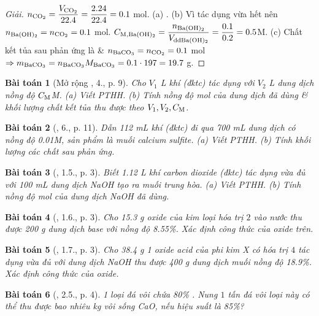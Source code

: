 \documentclass{article}
\newtheorem{baitoan}{Bài toán}
\begin{document}
\begin{proof}[Giải]
	$n_{\ce{CO2}} = \dfrac{V_{\ce{CO2}}}{22.4} = \dfrac{2.24}{22.4} = 0.1$ mol. (a) . (b) Vì  tác dụng vừa hết nên $n_{\ce{Ba(OH)2}} = n_{\ce{CO2}} = 0.1$ mol. $C_{\rm M,\ce{Ba(OH)2}} = \dfrac{n_{\ce{Ba(OH)2}}}{V_{\rm dd\ce{Ba(OH)2}}} = \dfrac{0.1}{0.2} = 0.5$M. (c) Chất kết tủa sau phản ứng là  \& $n_{\ce{BaCO3}} = n_{\ce{CO2}} = 0.1$ mol $\Rightarrow m_{\ce{BaCO3}} = n_{\ce{BaCO3}}M_{\ce{BaCO3}} = 0.1\cdot197 = 19.7$ g.
\end{proof}

\begin{baitoan}[Mở rộng \cite{SGK_Hoa_Hoc_9}, 4., p. 9]
	Cho $V_1$ \emph{L} khí \emph{} (đktc) tác dụng với $V_2$ \emph{L} dung dịch \emph{} nồng độ $C_{\rm M}$\emph{M}. (a) Viết PTHH. (b) Tính nồng độ mol của dung dịch \emph{} đã dùng \& khối lượng chất kết tủa thu được theo $V_1,V_2,C_{\rm M}$.
\end{baitoan}

\begin{baitoan}[\cite{SGK_Hoa_Hoc_9}, 6., p. 11]
	Dẫn \emph{112 mL} khí \emph{} (đktc) đi qua \emph{700 mL} dung dịch \emph{} có nồng độ \emph{0.01M}, sản phẩm là muối calcium sulfite. (a) Viết PTHH. (b) Tính khối lượng các chất sau phản ứng.
\end{baitoan}

\begin{baitoan}[\cite{SBT_Hoa_Hoc_9}, 1.5., p. 3]
	Biết \emph{1.12 L} khí carbon dioxide (đktc) tác dụng vừa đủ với \emph{100 mL} dung dịch \emph{NaOH} tạo ra muối trung hòa. (a) Viết PTHH. (b) Tính nồng độ mol của dung dịch \emph{NaOH} đã dùng.	
\end{baitoan}

\begin{baitoan}[\cite{SBT_Hoa_Hoc_9}, 1.6., p. 3]
	Cho \emph{15.3 g} oxide của kim loại hóa trị $2$ vào nước thu được \emph{200 g} dung dịch base với nồng độ \emph{8.55\%}. Xác định công thức của oxide trên.
\end{baitoan}

\begin{baitoan}[\cite{SBT_Hoa_Hoc_9}, 1.7., p. 3]
	Cho \emph{38.4 g} 1 oxide acid của phi kim X có hóa trị $4$ tác dụng vừa đủ với dung dịch \emph{NaOH} thu được \emph{400 g} dung dịch muối nồng độ \emph{18.9\%}. Xác định công thức của oxide.
\end{baitoan}

\begin{baitoan}[\cite{SBT_Hoa_Hoc_9}, 2.5., p. 4]
	1 loại đá vôi chứa \emph{80\% }. Nung $1$ tấn đá vôi loại này có thể thu được bao nhiêu \emph{kg} vôi sống \emph{CaO}, nếu hiệu suất là \emph{85\%}?
\end{baitoan}
\end{document}
